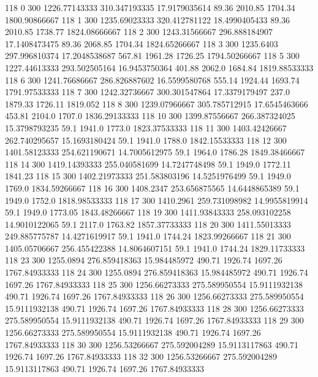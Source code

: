 118  0  300  1226.77143333  310.347193335  17.9179035614  89.36  2010.85  1704.34  1800.90866667 
118  1  300  1235.69023333  320.412781122  18.4990405433  89.36  2010.85  1738.77  1824.08666667 
118  2  300  1243.31566667  296.888184907  17.1408473475  89.36  2068.85  1704.34  1824.65266667 
118  3  300  1235.6403  297.996810374  17.2048538687  567.81  1961.28  1726.25  1794.50266667 
118  5  300  1227.44613333  293.502505164  16.9453750364  401.88  2062.0  1684.84  1819.88533333 
118  6  300  1241.76686667  286.826887602  16.5599580768  555.14  1924.44  1693.74  1791.97533333 
118  7  300  1242.32736667  300.301547864  17.3379179497  237.0  1879.33  1726.11  1819.052 
118  8  300  1239.07966667  305.785712915  17.6545463666  453.81  2104.0  1707.0  1836.29133333 
118  10  300  1399.87556667  266.387324025  15.3798793235  59.1  1941.0  1773.0  1823.37533333 
118  11  300  1403.42426667  262.740295657  15.1693180424  59.1  1941.0  1788.0  1842.15533333 
118  12  300  1401.58123333  254.621190671  14.7005612975  59.1  1964.0  1786.28  1849.38466667 
118  14  300  1419.14393333  255.040581699  14.7247748498  59.1  1949.0  1772.11  1841.23 
118  15  300  1402.21973333  251.583803196  14.5251976499  59.1  1949.0  1769.0  1834.59266667 
118  16  300  1408.2347  253.656875565  14.6448865389  59.1  1949.0  1752.0  1818.98533333 
118  17  300  1410.2961  259.731098982  14.9955819914  59.1  1949.0  1773.05  1843.48266667 
118  19  300  1411.93843333  258.093102258  14.9010122065  59.1  2117.0  1763.82  1857.37733333 
118  20  300  1411.55013333  249.885775787  14.4271619917  59.1  1941.0  1744.24  1823.99266667 
118  21  300  1405.05706667  256.455422388  14.8064607151  59.1  1941.0  1744.24  1829.11733333 
118  23  300  1255.0894  276.859418363  15.984485972  490.71  1926.74  1697.26  1767.84933333 
118  24  300  1255.0894  276.859418363  15.984485972  490.71  1926.74  1697.26  1767.84933333 
118  25  300  1256.66273333  275.589950554  15.9111932138  490.71  1926.74  1697.26  1767.84933333 
118  26  300  1256.66273333  275.589950554  15.9111932138  490.71  1926.74  1697.26  1767.84933333 
118  28  300  1256.66273333  275.589950554  15.9111932138  490.71  1926.74  1697.26  1767.84933333 
118  29  300  1256.66273333  275.589950554  15.9111932138  490.71  1926.74  1697.26  1767.84933333 
118  30  300  1256.53266667  275.592004289  15.9113117863  490.71  1926.74  1697.26  1767.84933333 
118  32  300  1256.53266667  275.592004289  15.9113117863  490.71  1926.74  1697.26  1767.84933333 

